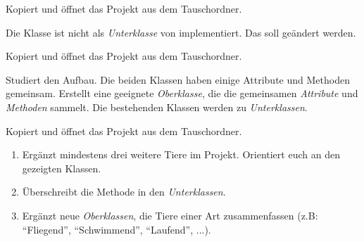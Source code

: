 \documentclass[10pt, a4paper]{arbeitsblatt}
\begin{document}
\ReiheTitel

\begin{aufgabe}[icon=\iconComputer\,\iconPartner]
	Kopiert und öffnet das Projekt  aus dem Tauschordner.

	Die Klasse  ist nicht als \emph{Unterklasse} von  implementiert. Das soll geändert werden.
\end{aufgabe}

\begin{aufgabe}[icon=\iconComputer\,\iconPartner]
	Kopiert und öffnet das Projekt  aus dem Tauschordner.

	Studiert den Aufbau. Die beiden Klassen haben einige Attribute und Methoden gemeinsam. Erstellt eine geeignete \emph{Oberklasse}, die die gemeinsamen \emph{Attribute} und \emph{Methoden} sammelt. Die bestehenden Klassen werden zu \emph{Unterklassen}.
\end{aufgabe}

\begin{aufgabe}[icon=\iconComputer\,\iconPartner]
	Kopiert und öffnet das Projekt  aus dem Tauschordner.

	\begin{enumerate}
		\item Ergänzt mindestens drei weitere Tiere im Projekt. Orientiert euch an den gezeigten Klassen.
		\item Überschreibt die Methode  in den \emph{Unterklassen}.
		\item Ergänzt neue \emph{Oberklassen}, die Tiere einer Art zusammenfassen (z.B: \enquote{Fliegend}, \enquote{Schwimmend}, \enquote{Laufend}, ...).
	\end{enumerate}
\end{aufgabe}
\end{document}
